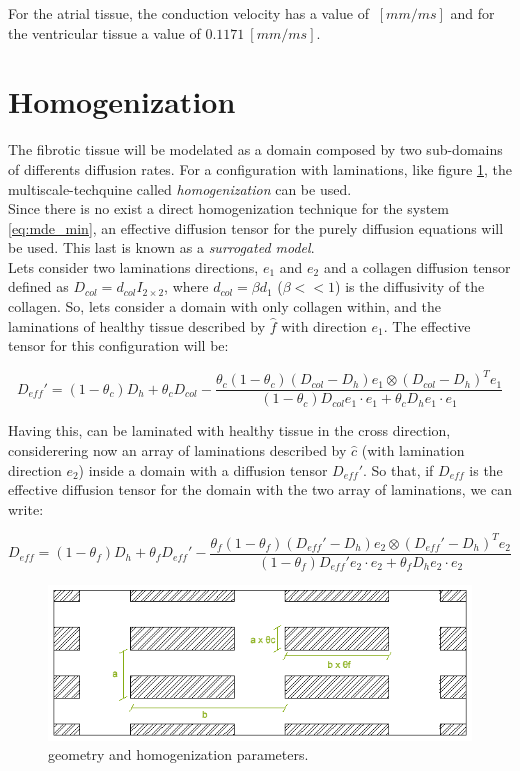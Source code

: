 For the atrial tissue, the conduction velocity has a value of $~[mm/ms]$ and for the ventricular tissue a value of $0.1171~ [mm/ms]$.

\newpage
\section{Homogenization}

The fibrotic tissue will be modelated as a domain composed by two sub-domains of differents diffusion rates. For a configuration with laminations, like figure \ref{fig:r2_convention}, the multiscale-techquine called \textsl{homogenization} can be used. \\

Since there is no exist a direct homogenization technique for the system \ref{eq:mde_min}, an effective diffusion tensor for the purely diffusion equations will be used. This last is known as a \textsl{surrogated model}. \\

Lets consider two laminations directions, $e_1$ and $e_2$ and a collagen diffusion tensor defined as $D_{col} = d_{col} I_{2 \times 2}$, where $d_{col} = \beta d_1$ ($\beta << 1$) is the diffusivity of the collagen. So, lets consider a domain with only collagen within, and the laminations of healthy tissue described by $\hat{f}$ with direction $e_1$. The effective tensor for this configuration will be:

\begin{equation}
D_{eff}'=
(1 - \theta_c)D_h + \theta_c D_{col} - \frac{\theta_c (1 - \theta_c)(D_{col} - D_{h})e_1 \otimes (D_{col} - D_{h})^T e_1}{(1 - \theta_c)D_{col} e_1 \cdot e_1 + \theta_c D_{h} e_1 \cdot e_1 }
\end{equation}

Having this, can be laminated with healthy tissue in the cross direction, considerering now an array of laminations described by $\hat{c}$ (with lamination direction $e_2$) inside a domain with a diffusion tensor $D_{eff}'$. So that, if $D_{eff}$ is the effective diffusion tensor for the domain with the two array of laminations, we can write:

\begin{equation}
D_{eff} = 
(1 - \theta_f)D_h + \theta_f D_{eff}' - \frac{\theta_f (1 - \theta_f)(D_{eff}' - D_h)e_2 \otimes (D_{eff}' - D_h)^T e_2}{(1 - \theta_f)D_{eff}' e_2 \cdot e_2 + \theta_f D_h e_2 \cdot e_2 }
\end{equation}

\begin{figure}[H]
\centering
\includegraphics[height = 4.1 cm]{fig/theorem_verification_r2-geometry_convention.png}
\caption{geometry and homogenization parameters.} \label{fig:r2_convention}
\end{figure}



